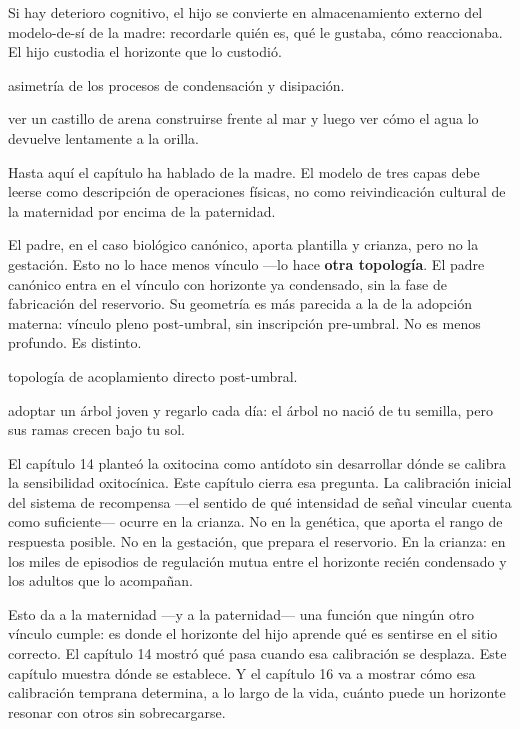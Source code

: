 Si hay deterioro cognitivo, el hijo se convierte en almacenamiento externo del modelo-de-sí de la madre: recordarle quién es, qué le gustaba, cómo reaccionaba. El hijo custodia el horizonte que lo custodió.

\begin{fisica}
 asimetría de los procesos de condensación y disipación.

 ver un castillo de arena construirse frente al mar y luego ver cómo el agua lo devuelve lentamente a la orilla.
\end{fisica}
\noindent Hasta aquí el capítulo ha hablado de la madre. El modelo de tres capas debe leerse como descripción de operaciones físicas, no como reivindicación cultural de la maternidad por encima de la paternidad.

El padre, en el caso biológico canónico, aporta plantilla y crianza, pero no la gestación. Esto no lo hace menos vínculo —lo hace \textbf{otra topología}. El padre canónico entra en el vínculo con horizonte ya condensado, sin la fase de fabricación del reservorio. Su geometría es más parecida a la de la adopción materna: vínculo pleno post-umbral, sin inscripción pre-umbral. No es menos profundo. Es distinto.

\begin{fisica}
 topología de acoplamiento directo post-umbral.

 adoptar un árbol joven y regarlo cada día: el árbol no nació de tu semilla, pero sus ramas crecen bajo tu sol.
\end{fisica}
\noindent El capítulo 14 planteó la oxitocina como antídoto sin desarrollar dónde se calibra la sensibilidad oxitocínica. Este capítulo cierra esa pregunta. La calibración inicial del sistema de recompensa —el sentido de qué intensidad de señal vincular cuenta como suficiente— ocurre en la crianza. No en la genética, que aporta el rango de respuesta posible. No en la gestación, que prepara el reservorio. En la crianza: en los miles de episodios de regulación mutua entre el horizonte recién condensado y los adultos que lo acompañan.

Esto da a la maternidad —y a la paternidad— una función que ningún otro vínculo cumple: es donde el horizonte del hijo aprende qué es sentirse en el sitio correcto. El capítulo 14 mostró qué pasa cuando esa calibración se desplaza. Este capítulo muestra dónde se establece. Y el capítulo 16 va a mostrar cómo esa calibración temprana determina, a lo largo de la vida, cuánto puede un horizonte resonar con otros sin sobrecargarse.

